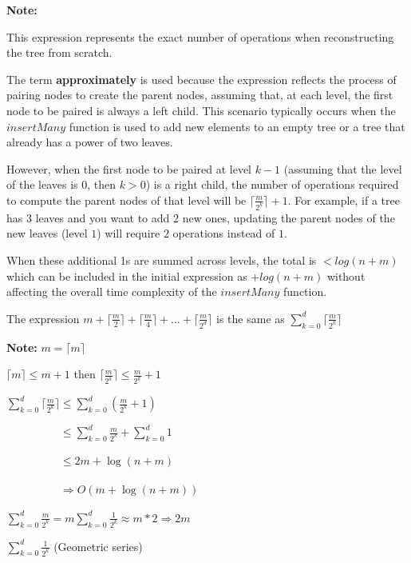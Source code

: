\documentclass{article}
\begin{document}
\textbf{Note:}

This expression represents the exact number of operations when reconstructing the tree from scratch.

The term \textbf{approximately} is used because the expression reflects the process of pairing nodes to create the parent nodes, assuming that, at each level, the first node to be paired is always a left child. This scenario typically occurs when the $insertMany$ function is used to add new elements to an empty tree or a tree that already has a power of two leaves.

However, when the first node to be paired at level $k-1$ (assuming that the level of the leaves is $0$, then $k > 0$) is a right child, the number of operations required to compute the parent nodes of that level will be $\lceil \frac{m}{2^k} \rceil + 1$. For example, if a tree has $3$ leaves and you want to add $2$ new ones, updating the parent nodes of the new leaves (level $1$) will require $2$ operations instead of $1$.

When these additional 1s are summed across levels, the total is $< log(n+m)$ which can be included in the initial expression as $+ log(n+m)$ without affecting the overall time complexity of the $insertMany$ function.

The expression $ m + \lceil \frac{m}{2} \rceil + \lceil \frac{m}{4} \rceil + ... + \lceil \frac{m}{2^d} \rceil$ is the same as $\sum_{k=0}^{d} \lceil \frac{m}{2^k} \rceil$

\textbf{Note:} $ m = \lceil m \rceil$

$\lceil m \rceil \leq m + 1$ then $\lceil \frac{m}{2^k} \rceil \leq \frac{m}{2^k} + 1$

$\sum_{k=0}^{d} \lceil \frac{m}{2^k} \rceil \leq \sum_{k=0}^{d} (\frac{m}{2^k} + 1)$

$\phantom{\sum_{k=0}^{d} \lceil \frac{m}{2^k} \rceil} \leq \sum_{k=0}^{d} \frac{m}{2^k} + \sum_{k=0}^{d} 1$

$\phantom{\sum_{k=0}^{d} \lceil \frac{m}{2^k} \rceil} \leq 2m + \log (n+m)$

$\phantom{\sum_{k=0}^{d} \lceil \frac{m}{2^k} \rceil} \Rightarrow \boxed{O(m + \log (n+m))}$

$\sum_{k=0}^{d} \frac{m}{2^k} = m \sum_{k=0}^{d} \frac{1}{2^k} \approx m * 2 \Rightarrow 2m$

$\sum_{k=0}^{d} \frac{1}{2^k}$ (Geometric series)
\end{document}
